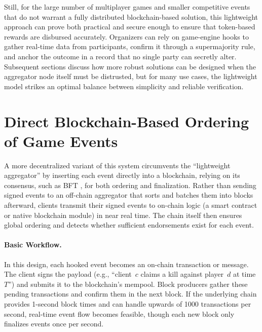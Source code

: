 \documentclass[11pt]{article}
\begin{document}
Still, for the large number of multiplayer games and smaller competitive events that do not warrant a fully distributed blockchain-based solution, this lightweight approach can prove both practical and secure enough to ensure that token-based rewards are disbursed accurately. Organizers can rely on game-engine hooks to gather real-time data from participants, confirm it through a supermajority rule, and anchor the outcome in a record that no single party can secretly alter. Subsequent sections discuss how more robust solutions can be designed when the aggregator node itself must be distrusted, but for many use cases, the lightweight model strikes an optimal balance between simplicity and reliable verification.



\section{Direct Blockchain-Based Ordering of Game Events}
\label{sec:blockchainInsertion}

A more decentralized variant of this system circumvents the “lightweight aggregator” by inserting each event directly into a blockchain, relying on its consensus, such as BFT \cite{pbft}, for both ordering and finalization. Rather than sending signed events to an off-chain aggregator that sorts and batches them into blocks afterward, clients transmit their signed events to on-chain logic (a smart contract or native blockchain module) in near real time. The chain itself then ensures global ordering and detects whether sufficient endorsements exist for each event.

\paragraph{Basic Workflow.}
In this design, each hooked event becomes an on-chain transaction or message. The client signs the payload (e.g., “client~$c$ claims a kill against player~$d$ at time~$T$”) and submits it to the blockchain’s mempool. Block producers gather these pending transactions and confirm them in the next block. If the underlying chain provides 1-second block times and can handle upwards of 1000 transactions per second, real-time event flow becomes feasible, though each new block only finalizes events once per second.
\end{document}
